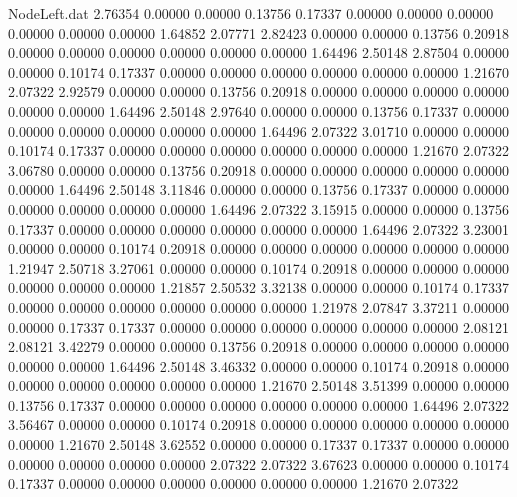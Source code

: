 \begin{filecontents}{NodeLeft.dat}
   2.76354    0.00000    0.00000     0.13756    0.17337    0.00000    0.00000    0.00000    0.00000    0.00000    0.00000    1.64852    2.07771
   2.82423    0.00000    0.00000     0.13756    0.20918    0.00000    0.00000    0.00000    0.00000    0.00000    0.00000    1.64496    2.50148
   2.87504    0.00000    0.00000     0.10174    0.17337    0.00000    0.00000    0.00000    0.00000    0.00000    0.00000    1.21670    2.07322
   2.92579    0.00000    0.00000     0.13756    0.20918    0.00000    0.00000    0.00000    0.00000    0.00000    0.00000    1.64496    2.50148
   2.97640    0.00000    0.00000     0.13756    0.17337    0.00000    0.00000    0.00000    0.00000    0.00000    0.00000    1.64496    2.07322
   3.01710    0.00000    0.00000     0.10174    0.17337    0.00000    0.00000    0.00000    0.00000    0.00000    0.00000    1.21670    2.07322
   3.06780    0.00000    0.00000     0.13756    0.20918    0.00000    0.00000    0.00000    0.00000    0.00000    0.00000    1.64496    2.50148
   3.11846    0.00000    0.00000     0.13756    0.17337    0.00000    0.00000    0.00000    0.00000    0.00000    0.00000    1.64496    2.07322
   3.15915    0.00000    0.00000     0.13756    0.17337    0.00000    0.00000    0.00000    0.00000    0.00000    0.00000    1.64496    2.07322
   3.23001    0.00000    0.00000     0.10174    0.20918    0.00000    0.00000    0.00000    0.00000    0.00000    0.00000    1.21947    2.50718
   3.27061    0.00000    0.00000     0.10174    0.20918    0.00000    0.00000    0.00000    0.00000    0.00000    0.00000    1.21857    2.50532
   3.32138    0.00000    0.00000     0.10174    0.17337    0.00000    0.00000    0.00000    0.00000    0.00000    0.00000    1.21978    2.07847
   3.37211    0.00000    0.00000     0.17337    0.17337    0.00000    0.00000    0.00000    0.00000    0.00000    0.00000    2.08121    2.08121
   3.42279    0.00000    0.00000     0.13756    0.20918    0.00000    0.00000    0.00000    0.00000    0.00000    0.00000    1.64496    2.50148
   3.46332    0.00000    0.00000     0.10174    0.20918    0.00000    0.00000    0.00000    0.00000    0.00000    0.00000    1.21670    2.50148
   3.51399    0.00000    0.00000     0.13756    0.17337    0.00000    0.00000    0.00000    0.00000    0.00000    0.00000    1.64496    2.07322
   3.56467    0.00000    0.00000     0.10174    0.20918    0.00000    0.00000    0.00000    0.00000    0.00000    0.00000    1.21670    2.50148
   3.62552    0.00000    0.00000     0.17337    0.17337    0.00000    0.00000    0.00000    0.00000    0.00000    0.00000    2.07322    2.07322
   3.67623    0.00000    0.00000     0.10174    0.17337    0.00000    0.00000    0.00000    0.00000    0.00000    0.00000    1.21670    2.07322

\end{filecontents}
